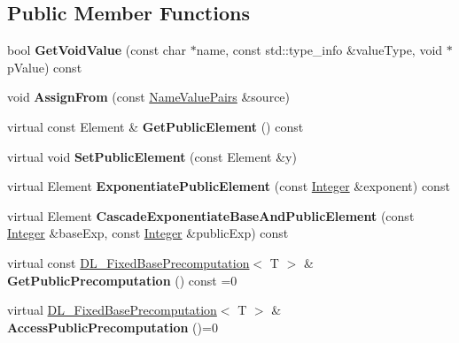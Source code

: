 \subsection*{Public Member Functions}
\begin{DoxyCompactItemize}
\item 
\hypertarget{class_d_l___public_key_ab2ca695435636ee4d965da9b6885c4b7}{
bool {\bfseries GetVoidValue} (const char $\ast$name, const std::type\_\-info \&valueType, void $\ast$pValue) const }
\label{class_d_l___public_key_ab2ca695435636ee4d965da9b6885c4b7}

\item 
\hypertarget{class_d_l___public_key_a7adbe2e3adc4bdb8a60ffd653d91532e}{
void {\bfseries AssignFrom} (const \hyperlink{class_name_value_pairs}{NameValuePairs} \&source)}
\label{class_d_l___public_key_a7adbe2e3adc4bdb8a60ffd653d91532e}

\item 
\hypertarget{class_d_l___public_key_a585a1c73e014cde0d50cc4d1e926a17f}{
virtual const Element \& {\bfseries GetPublicElement} () const }
\label{class_d_l___public_key_a585a1c73e014cde0d50cc4d1e926a17f}

\item 
\hypertarget{class_d_l___public_key_a86cac45fc0ddaf07c057061b93cd8ce1}{
virtual void {\bfseries SetPublicElement} (const Element \&y)}
\label{class_d_l___public_key_a86cac45fc0ddaf07c057061b93cd8ce1}

\item 
\hypertarget{class_d_l___public_key_ac4e840699a7918a90d72c03cd2b47bc3}{
virtual Element {\bfseries ExponentiatePublicElement} (const \hyperlink{class_integer}{Integer} \&exponent) const }
\label{class_d_l___public_key_ac4e840699a7918a90d72c03cd2b47bc3}

\item 
\hypertarget{class_d_l___public_key_a63d54207437aeb69fcccdd1fbbde12e8}{
virtual Element {\bfseries CascadeExponentiateBaseAndPublicElement} (const \hyperlink{class_integer}{Integer} \&baseExp, const \hyperlink{class_integer}{Integer} \&publicExp) const }
\label{class_d_l___public_key_a63d54207437aeb69fcccdd1fbbde12e8}

\item 
\hypertarget{class_d_l___public_key_a14a74e0fd35ec6441424fb09e5ba4512}{
virtual const \hyperlink{class_d_l___fixed_base_precomputation}{DL\_\-FixedBasePrecomputation}$<$ T $>$ \& {\bfseries GetPublicPrecomputation} () const =0}
\label{class_d_l___public_key_a14a74e0fd35ec6441424fb09e5ba4512}

\item 
\hypertarget{class_d_l___public_key_aaf42f2ffabd071995559be72eb7ae845}{
virtual \hyperlink{class_d_l___fixed_base_precomputation}{DL\_\-FixedBasePrecomputation}$<$ T $>$ \& {\bfseries AccessPublicPrecomputation} ()=0}
\label{class_d_l___public_key_aaf42f2ffabd071995559be72eb7ae845}

\end{DoxyCompactItemize}


